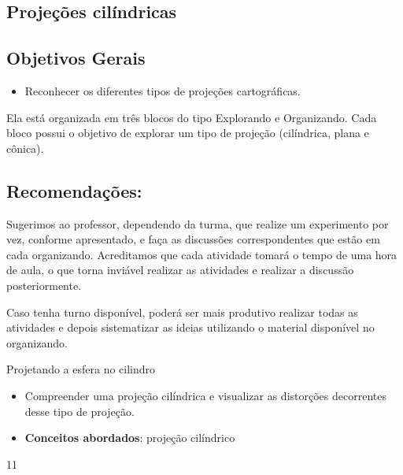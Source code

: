 \clearpage

\def\currentcolor{session1}
\begin{texto}
{
\section*{Projeções cilíndricas}

\subsection*{Objetivos Gerais}

\begin{itemize}
\item Reconhecer os diferentes tipos de projeções cartográficas.
\end{itemize}

Ela está organizada em três blocos do tipo Explorando e Organizando. Cada bloco possui o objetivo de explorar um tipo de projeção (cilíndrica, plana e cônica).

\subsection*{Recomendações:}

Sugerimos ao professor, dependendo da turma, que realize um experimento por vez, conforme apresentado, e faça as discussões correspondentes que estão em cada organizando. Acreditamos que cada atividade tomará o tempo de uma hora de aula, o que torna inviável realizar as atividades e realizar a discussão posteriormente.

Caso tenha turno disponível, poderá ser mais produtivo realizar todas as atividades e depois sistematizar as ideias utilizando o material disponível no organizando.
}
\end{texto}
\begin{objectives}{Projetando a esfera no cilindro}
{
  \begin{itemize}
  \item Compreender uma projeção cilíndrica e visualizar as distorções decorrentes desse tipo de projeção.

  \item \textbf{Conceitos abordados}: projeção cilíndrico
  \end{itemize}    
}{1}{1}
\end{objectives}
